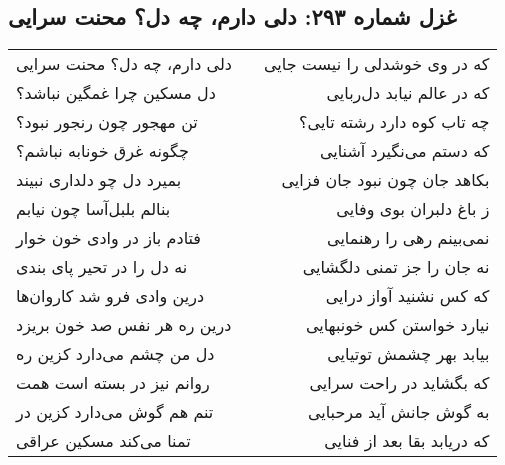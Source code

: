 \begin{center}
\section*{غزل شماره ۲۹۳: دلی دارم، چه دل؟ محنت سرایی}
\label{sec:293}
\begin{longtable}{l p{0.5cm} r}
دلی دارم، چه دل؟ محنت سرایی
&&
که در وی خوشدلی را نیست جایی
\\
دل مسکین چرا غمگین نباشد؟
&&
که در عالم نیابد دل‌ربایی
\\
تن مهجور چون رنجور نبود؟
&&
چه تاب کوه دارد رشته تایی؟
\\
چگونه غرق خونابه نباشم؟
&&
که دستم می‌نگیرد آشنایی
\\
بمیرد دل چو دلداری نبیند
&&
بکاهد جان چون نبود جان فزایی
\\
بنالم بلبل‌آسا چون نیابم
&&
ز باغ دلبران بوی وفایی
\\
فتادم باز در وادی خون خوار
&&
نمی‌بینم رهی را رهنمایی
\\
نه دل را در تحیر پای بندی
&&
نه جان را جز تمنی دلگشایی
\\
درین وادی فرو شد کاروان‌ها
&&
که کس نشنید آواز درایی
\\
درین ره هر نفس صد خون بریزد
&&
نیارد خواستن کس خونبهایی
\\
دل من چشم می‌دارد کزین ره
&&
بیابد بهر چشمش توتیایی
\\
روانم نیز در بسته است همت
&&
که بگشاید در راحت سرایی
\\
تنم هم گوش می‌دارد کزین در
&&
به گوش جانش آید مرحبایی
\\
تمنا می‌کند مسکین عراقی
&&
که دریابد بقا بعد از فنایی
\\
\end{longtable}
\end{center}
